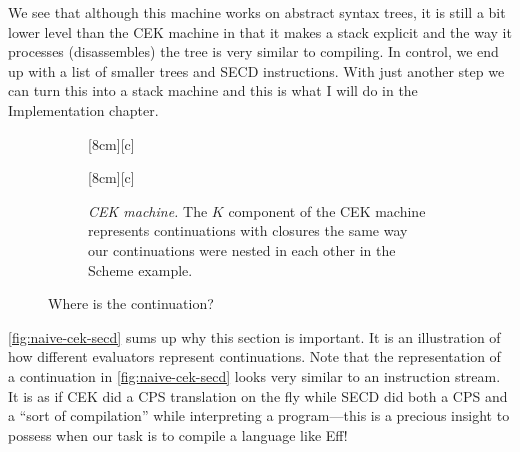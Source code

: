 \documentclass[class=article, crop=false]{standalone}
\begin{document}
We see that although this machine works on abstract syntax trees, it is still a
bit lower level than the CEK machine in that it makes a stack explicit and the
way it processes (disassembles) the tree is very similar to compiling. In
control, we end up with a list of smaller trees and SECD instructions. With 
just another step we can turn this into a stack machine and this is what I will
do in the Implementation chapter. 
%
%
\begin{figure}
  \begin{subfigure}{.5\textwidth}
    [8cm][c]
    {}
    \label{fig:continuation-naive}
  \end{subfigure}
  \begin{subfigure}{.5\textwidth}
    [8cm][c]
    {}
    \label{fig:continuation-secd}
  \end{subfigure}
  \begin{subfigure}{\textwidth}
    \centering
    \caption{\emph{CEK machine.} The $K$ component of the CEK machine represents
    continuations with closures the same way our continuations were nested in each other in the
    Scheme example.}
    \label{fig:continuation-cek}
  \end{subfigure}
  \caption{Where is the continuation?}
  \label{fig:naive-cek-secd}
\end{figure}
%
\autoref{fig:naive-cek-secd} sums up why this section is important. It is an
illustration of how different evaluators represent continuations. Note that the
representation of a continuation in \autoref{fig:naive-cek-secd} looks
very similar to an instruction stream. It is as if CEK did a CPS translation on
the fly while SECD did both a CPS and a ``sort of compilation'' while
interpreting a program---this is a precious insight to possess when our task is to
compile a language like Eff!
\end{document}

